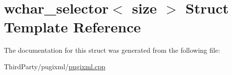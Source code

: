 \hypertarget{structwchar__selector}{\section{wchar\-\_\-selector$<$ size $>$ Struct Template Reference}
\label{structwchar__selector}
}


The documentation for this struct was generated from the following file\-:\begin{DoxyCompactItemize}
\item 
Third\-Party/pugixml/\hyperlink{pugixml_8cpp}{pugixml.\-cpp}\end{DoxyCompactItemize}
